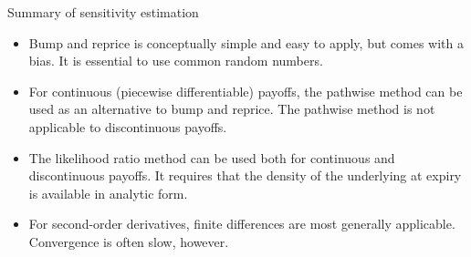 \documentclass[pdf, handout]{beamer}
\begin{document}
\begin{frame}{Summary of sensitivity estimation}
\begin{itemize}
\item Bump and reprice is conceptually simple and easy to apply, but comes with a bias.
It is essential to use common random numbers.\pause
\item For continuous (piecewise differentiable) payoffs, the pathwise method can be
used as an alternative to bump and reprice. The pathwise method is not applicable to
discontinuous payoffs.\pause
\item The likelihood ratio method can be used both for continuous and discontinuous
payoffs. It requires that the density of the underlying at expiry is available in
analytic form.\pause
\item For second-order derivatives, finite differences are most generally applicable.
Convergence is often slow, however.
\end{itemize}
\end{frame}
\end{document}
